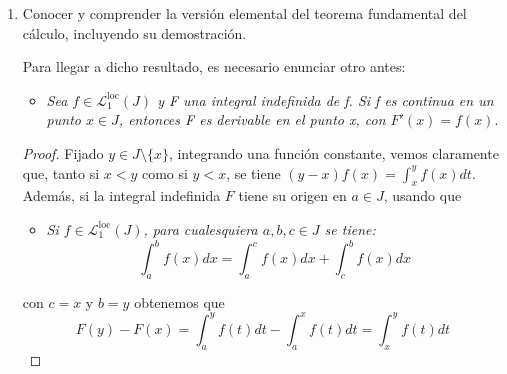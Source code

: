 \documentclass[a4paper, 12pt]{article}
\newtheorem*{teorema*}{Teorema}
\begin{document}
\begin{enumerate}[label=\textbf{\arabic*}.]
\begin{enumerate}[label=\textit{\alph*)}]
		Lo primero de todo, tenemos que dar la siguiente definición: se dice que una función \(F: K \to \mathbb{R}\) es \textbf{absolutamente continua}, cuando para cada \(\varepsilon > 0\) pueda encontrarse un \(\delta > 0\) verificando la siguiente condición: si \(n \in \mathbb{N}\) y \(\{]a_k, b_k[ : k \in \Delta_n\}\) es una familia de intervalos abiertos no vacíos, dos a dos disjuntos y contenidos en \(K\), se tiene:
		\[
			\sum_{k=1}^{n} (b_k - a_k) < \delta \Longrightarrow \sum_{k=1}^{n} | F(b_k) - F(a_k) | < \varepsilon
		\]
		
		\begin{teorema*}[Fundamental del Cálculo]
		Dado un intervalo no trivial \(J \subset \mathbb{R}\), sea \(F: J \to \mathbb{R}\) una función, verificando que \(F_{|_K}\) es absolutamente continua, para todo intervalo compacto \(K \subset J\). Entonces F es derivable c.p.d en J y su derivada es localmente integrable en J con 
		\[
			\int_a^b F'(t) dt = F(b) - F(a) \qquad \forall a,b \in J
		\]
		\end{teorema*}
		
		Conviene resaltar que el resultado anterior puede expresarse de forma que muestre la integración como operación inversa de la derivación.
	\end{enumerate}
	
	\bigskip
	
	\item Conocer y comprender la versión elemental del teorema fundamental del cálculo, incluyendo su demostración.
	
	Para llegar a dicho resultado, es necesario enunciar otro antes:
	\begin{itemize}
		\item \textit{Sea \(f \in \mathcal{L}_1^{\text{loc}}(J)\) y F una integral indefinida de f. Si f es continua en un punto \(x \in J\), entonces F es derivable en el punto x, con \(F' (x) = f(x)\)}.
	\end{itemize}
	
	\begin{proof}
	Fijado \(y \in J \setminus \{x\}\), integrando una función constante, vemos claramente que, tanto si \(x < y\) como si \(y < x\), se tiene \((y -x) f(x) = \int_x^y f(x) dt\). Además, si la integral indefinida \(F\) tiene su origen en \(a \in J\), usando que
	\begin{itemize}
		\item \textit{Si \(f \in \mathcal{L}_1^{\text{loc}}(J)\), para cualesquiera \(a,b,c \in J\) se tiene:}
		\begin{equation}\label{cuatro}
			\int_a^b f(x) dx = \int_a^c f(x) dx + \int_c^b f(x) dx
		\end{equation}
	\end{itemize}
	con \(c = x\) y \(b = y\) obtenemos que
	\[
		F(y) - F(x) = \int_a^y f(t) dt - \int_a^x f(t) dt = \int_x^y f(t) dt
	\]
	

\end{proof}
\end{enumerate}
\end{document}
